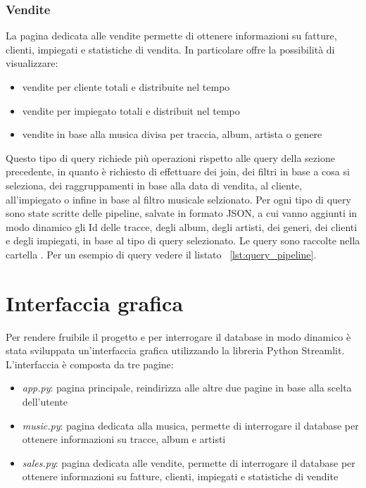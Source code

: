 \documentclass{article}
\begin{document}
\subsubsection{Vendite}
La pagina dedicata alle vendite permette di ottenere informazioni su fatture, clienti, impiegati e statistiche di vendita. In particolare offre la possibilità di visualizzare:
\begin{itemize}
    \item vendite per cliente totali e distribuite nel tempo
    \item vendite per impiegato totali e distribuit nel tempo
    \item vendite in base alla musica divisa per traccia, album, artista o genere
\end{itemize}
    
Questo tipo di query richiede più operazioni rispetto alle query della sezione precedente, in quanto è richiesto di effettuare dei join, dei filtri in base a cosa si seleziona, dei raggruppamenti
in base alla data di vendita, al cliente, all'impiegato o infine in base al filtro musicale selzionato. Per ogni tipo di query sono state scritte delle pipeline, salvate in formato JSON, a cui vanno aggiunti in modo dinamico
gli Id delle tracce, degli album, degli artisti, dei generi, dei clienti e degli impiegati, in base al tipo di query selezionato. Le query sono raccolte nella cartella .
Per un esempio di query vedere il listato ~\ref{lst:query_pipeline}.

\section{Interfaccia grafica}
Per rendere fruibile il progetto e per interrogare il database in modo dinamico è stata sviluppata un'interfaccia grafica utilizzando
la libreria Python Streamlit. L'interfaccia è composta da tre pagine:
\begin{itemize}
    \item \textit{app.py}: pagina principale, reindirizza alle altre due pagine in base alla scelta dell'utente
    \item \textit{music.py}: pagina dedicata alla musica, permette di interrogare il database per ottenere informazioni su tracce, album e artisti
    \item \textit{sales.py}: pagina dedicata alle vendite, permette di interrogare il database per ottenere informazioni su fatture, clienti, impiegati e statistiche di vendite
\end{itemize}
\end{document}
